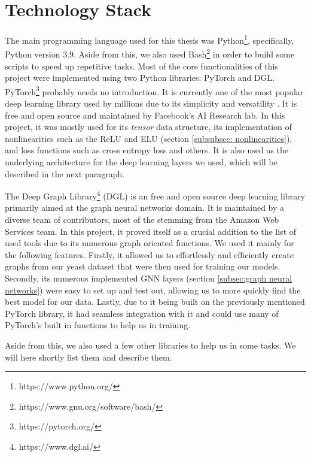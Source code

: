 \documentclass[times, utf8, diplomski, english]{fer_eng}
\begin{document}
\section{Technology Stack}
\label{sec:technology stack}

The main programming language used for this thesis was Python\footnote{https://www.python.org/}, specifically, Python version 3.9. Aside from this, we also used Bash\footnote{https://www.gnu.org/software/bash/} in order to build some scripts to speed up repetitive tasks. Most of the core functionalities of this project were implemented using two Python libraries: PyTorch and DGL. PyTorch\footnote{https://pytorch.org/} probably needs no introduction. It is currently one of the most popular deep learning library used by millions due to its simplicity and versatility \cite{popular_ml}. It is free and open source and maintained by Facebook's AI Research lab. In this project, it was mostly used for its \textit{tensor} data structure, its implementation of nonlinearities such as the ReLU and ELU (section \ref{subsubsec: nonlinearities}), and loss functions such as cross entropy loss and others. It is also used as the underlying architecture for the deep learning layers we used, which will be described in the next paragraph.

The Deep Graph Library\footnote{https://www.dgl.ai/} (DGL) \cite{DGL} is an free and open source deep learning library primarily aimed at the graph neural networks domain. It is maintained by a diverse team of contributors, most of the stemming from the Amazon Web Services team. In this project, it proved itself as a crucial addition to the list of used tools due to its numerous graph oriented functions. We used it mainly for the following features. Firstly, it allowed us to effortlessly and efficiently create graphs from our yeast dataset that were then used for training our models. Secondly, its numerous implemented GNN layers (section \ref{subsec:graph neural networks}) were easy to set up and test out, allowing us to more quickly find the best model for our data. Lastly, due to it being built on the previously mentioned PyTorch library, it had seamless integration with it and could use many of PyTorch's built in functions to help us in training.

Aside from this, we also used a few other libraries to help us in some tasks. We will here shortly list them and describe them.
\end{document}
